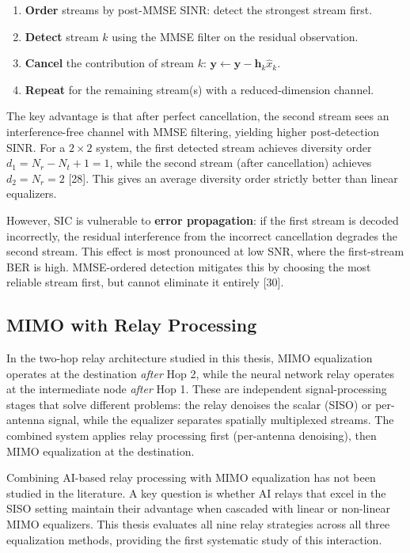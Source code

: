 \begin{enumerate}
\def\labelenumi{\arabic{enumi}.}
\tightlist
\item
  \textbf{Order} streams by post-MMSE SINR: detect the strongest stream first.
\item
  \textbf{Detect} stream \(k\) using the MMSE filter on the residual observation.
\item
  \textbf{Cancel} the contribution of stream \(k\): \(\mathbf{y} \leftarrow \mathbf{y} - \mathbf{h}_k \hat{x}_k\).
\item
  \textbf{Repeat} for the remaining stream(s) with a reduced-dimension channel.
\end{enumerate}

The key advantage is that after perfect cancellation, the second stream sees an interference-free channel with MMSE filtering, yielding higher post-detection SINR. For a \(2 \times 2\) system, the first detected stream achieves diversity order \(d_1 = N_r - N_t + 1 = 1\), while the second stream (after cancellation) achieves \(d_2 = N_r = 2\) {[}28{]}. This gives an average diversity order strictly better than linear equalizers.

However, SIC is vulnerable to \textbf{error propagation}: if the first stream is decoded incorrectly, the residual interference from the incorrect cancellation degrades the second stream. This effect is most pronounced at low SNR, where the first-stream BER is high. MMSE-ordered detection mitigates this by choosing the most reliable stream first, but cannot eliminate it entirely {[}30{]}.

\subsection{MIMO with Relay Processing}\label{sec:mimo-with-relay-processing}

In the two-hop relay architecture studied in this thesis, MIMO equalization operates at the destination \emph{after} Hop 2, while the neural network relay operates at the intermediate node \emph{after} Hop 1. These are independent signal-processing stages that solve different problems: the relay denoises the scalar (SISO) or per-antenna signal, while the equalizer separates spatially multiplexed streams. The combined system applies relay processing first (per-antenna denoising), then MIMO equalization at the destination.

Combining AI-based relay processing with MIMO equalization has not been studied in the literature. A key question is whether AI relays that excel in the SISO setting maintain their advantage when cascaded with linear or non-linear MIMO equalizers. This thesis evaluates all nine relay strategies across all three equalization methods, providing the first systematic study of this interaction.

